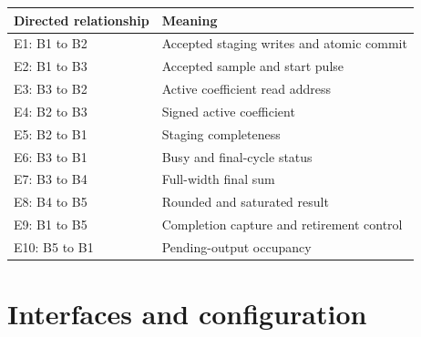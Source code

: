 \documentclass[11pt,a4paper]{article}
\begin{document}
{\small\renewcommand{\arraystretch}{1.18}\begin{longtable}{@{}L{0.24\textwidth}|L{0.7\textwidth}@{}}\toprule

\textbf{Directed relationship} & \textbf{Meaning}\\\midrule\endhead

E1: B1 to B2 & Accepted staging writes and atomic commit\\[2pt]\hline

E2: B1 to B3 & Accepted sample and start pulse\\[2pt]\hline

E3: B3 to B2 & Active coefficient read address\\[2pt]\hline

E4: B2 to B3 & Signed active coefficient\\[2pt]\hline

E5: B2 to B1 & Staging completeness\\[2pt]\hline

E6: B3 to B1 & Busy and final-cycle status\\[2pt]\hline

E7: B3 to B4 & Full-width final sum\\[2pt]\hline

E8: B4 to B5 & Rounded and saturated result\\[2pt]\hline

E9: B1 to B5 & Completion capture and retirement control\\[2pt]\hline

E10: B5 to B1 & Pending-output occupancy\\[2pt]\hline

\bottomrule\end{longtable}}

\section{Interfaces and configuration}
\end{document}
